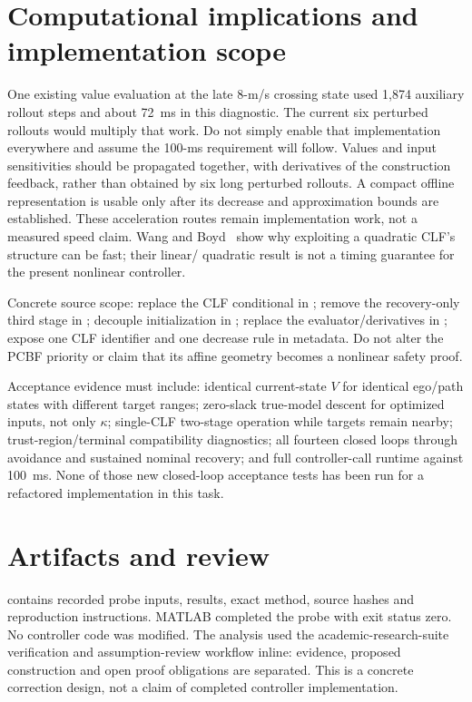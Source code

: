 \documentclass[11pt]{article}
\begin{document}
\section{Computational implications and implementation scope}
One existing value evaluation at the late 8-m/s crossing state used 1,874
auxiliary rollout steps and about 72~ms in this diagnostic. The current six
perturbed rollouts would multiply that work. Do not simply enable that
implementation everywhere and assume the 100-ms requirement will follow.
Values and input sensitivities should be propagated together, with derivatives
of the construction feedback, rather than obtained by six long perturbed
rollouts. A compact offline representation is usable only after its decrease
and approximation bounds are established. These acceleration routes remain
implementation work, not a measured speed claim. Wang and Boyd~\cite{fast}
show why exploiting a quadratic CLF's structure can be fast; their linear/
quadratic result is not a timing guarantee for the present nonlinear controller.

Concrete source scope: replace the CLF conditional in
; remove the recovery-only third
stage in ; decouple initialization in ;
replace the evaluator/derivatives in ; expose one
CLF identifier and one decrease rule in metadata. Do not alter the PCBF
priority or claim that its affine geometry becomes a nonlinear safety proof.

Acceptance evidence must include: identical current-state $V$ for identical
ego/path states with different target ranges; zero-slack true-model descent
for optimized inputs, not only $\kappa$; single-CLF two-stage operation while
targets remain nearby; trust-region/terminal compatibility diagnostics; all
fourteen closed loops through avoidance and sustained nominal recovery; and
full controller-call runtime against 100~ms. None of those new closed-loop
acceptance tests has been run for a refactored implementation in this task.

\section{Artifacts and review}
 contains recorded probe inputs,
results, exact method, source hashes and reproduction instructions. MATLAB
completed the probe with exit status zero. No controller code was modified.
The analysis used the academic-research-suite verification and assumption-review
workflow inline: evidence, proposed construction and open proof obligations
are separated. This is a concrete correction design, not a claim of completed
controller implementation.
\end{document}

